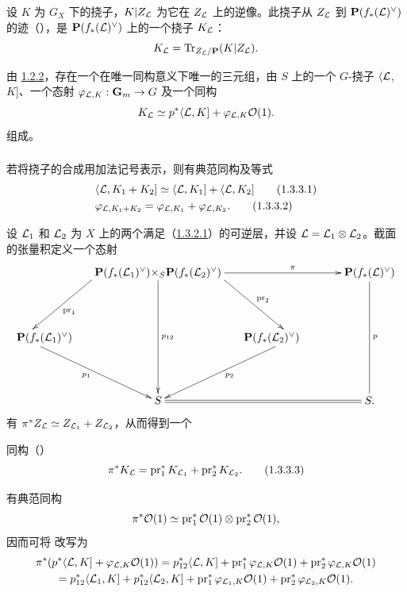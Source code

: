 设 $K$ 为 $G_{X}$ 下的挠子，$K|Z_{{\mathcal L}}$ 为它在 $Z_{{\mathcal L}}$ 上的逆像。此挠子从 $Z_{{\mathcal L}}$ 到 $\mathbf{P}(f_{\ast}({\mathcal L})^{\vee})$ 的迹（），是 $\mathbf{P}(f_{\ast}({\mathcal L})^{\vee})$ 上的一个挠子 $K_{{\mathcal L}}$： $$
K_{{\mathcal L}}=\operatorname{Tr}_{Z_{{\mathcal L}}/\mathbf{P}}(K|Z_{{\mathcal L}}){}.
$$

由 \hyperref[XVIII.thm1.2.2]{1.2.2}，存在一个在唯一同构意义下唯一的三元组，由 $S$ 上的一个 $G$-挠子 $\langle {\mathcal L}$, $K$]、一个态射 $\varphi_{{\mathcal L},K}:\mathbf{G}_{m}\rightarrow G$ 及一个同构 $$
K_{{\mathcal L}}\simeq
p^{\ast}\langle {\mathcal L},K]+\varphi_{{\mathcal L},K}{\mathcal O}(1){}.
$$ 组成。

\subsubsection{} 若\pageoriginale 将挠子的合成用加法记号表示，则有典范同构及等式 \begin{align*}
& \langle {\mathcal L},K_{1}+K_{2}] \simeq
\langle {\mathcal L},K_{1}]+\langle {\mathcal L},K_{2}]\tag{1.3.3.1}\\
& \varphi_{{\mathcal L}, K_{1}+K_{2}}=\varphi_{{\mathcal L},K_{1}}+\varphi_{{\mathcal L},K_{2}}{}.\tag{1.3.3.2}
\end{align*} 

设 ${\mathcal L}_{1}$ 和 ${\mathcal L}_{2}$ 为 $X$ 上的两个满足（\hyperref[XVIII.par1.3.2.1]{1.3.2.1}）的可逆层，并设 ${\mathcal L}={\mathcal L}_{1}\otimes {\mathcal L}_{2}$。截面的张量积定义一个态射 $$
\xymatrix@R=1.5cm@C=.5cm{
 & **[r] \PP
  (f_{\ast}(\Ll_1)^{\vee}) \ar[ld]^{\pr_1}& \times_S \ar[dd]^{p_{12}}& **[l]\PP
  (f_{\ast}(\Ll_2)^{\vee})\ar[rr]^{\pi}\ar[rd]^{\pr_2} &     &
 \PP(f_{\ast}(\Ll)^{\vee}) \ar@{-}[dd]^{p}\\
**[r]\PP(f_*(\Ll_1)^{\vee})\ar[rrd]_{p_1}&          &                &                 &  **[l]\PP(f_{\ast}(\Ll_2)^{\vee}) \ar[lld]^{p_2}  &\\
 &          &  S     \ar@{=}[rrr]        &                 &      & S.
}
$$ 有 $\pi^{\ast}Z_{{\mathcal L}}\simeq Z_{{\mathcal L}_{1}}+Z_{{\mathcal L}_{2}}$，从而得到一个

同构（） \begin{equation*}
\pi^{\ast}K_{{\mathcal L}}=\operatorname{pr}^{\ast}_{1}K_{{\mathcal L}_{1}}+\operatorname{pr}^{\ast}_{2}K_{{\mathcal L}_{2}}{}.\tag{1.3.3.3}
\end{equation*}

有典范同构 $$
\pi^{\ast}{\mathcal O}(1)\simeq \operatorname{pr}^{\ast}_{1}{\mathcal O}(1)\otimes
\operatorname{pr}^{\ast}_{2}{\mathcal O}(1){},
$$ 因而可将  改写为 \begin{gather*}
\pi^{\ast}(p^{\ast}\langle {\mathcal L},K]+\varphi_{{\mathcal L},K}{\mathcal O}(1))=
p^{\ast}_{12}\langle {\mathcal L},K]+\operatorname{pr}^{\ast}_{1}\varphi_{{\mathcal L},K}{\mathcal O}(1)+\operatorname{pr}^{\ast}_{2}\varphi_{{\mathcal L},K}{\mathcal O}(1) \\
= p^{\ast}_{12}\langle {\mathcal L}_{1},K]+p^{\ast}_{12}\langle {\mathcal L}_{2},K]+\operatorname{pr}^{\ast}_{1}\varphi_{{\mathcal L}_{1},K}{\mathcal O}(1)+\operatorname{pr}^{\ast}_{2}\varphi_{{\mathcal L}_{2},K}{\mathcal O}(1){}.
\end{gather*}

